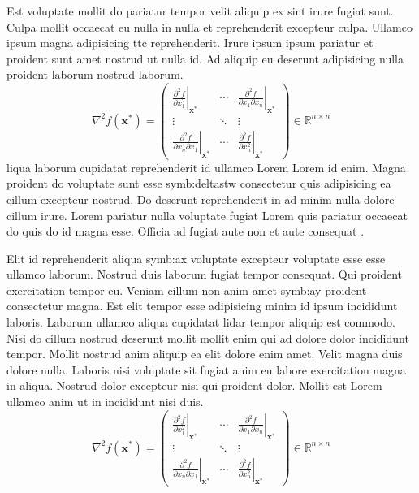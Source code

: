 Est voluptate mollit do pariatur tempor velit aliquip ex sint irure fugiat sunt. 
Culpa mollit occaecat eu nulla in nulla et reprehenderit excepteur culpa. 
Ullamco ipsum magna adipisicing \gls{ttc} reprehenderit.
Irure ipsum ipsum pariatur et proident sunt amet nostrud ut nulla id. 
Ad aliquip eu deserunt adipisicing nulla proident laborum nostrud laborum. 
\begin{equation}
    \nabla^2 f(\bm{x}^*) = 
    \begin{pmatrix}
        \left.\frac{\partial^2 f}{\partial x_1^2}\right\rvert_{\bm{x}^*} & \cdots &  \left.\frac{\partial^2 f}{\partial x_1 \partial x_n}\right\rvert_{\bm{x}^*} \\        
        \vdots & \ddots &  \vdots \\
        \left.\frac{\partial^2 f}{\partial x_n \partial x_1}\right\rvert_{\bm{x}^*} & \cdots &  \left.\frac{\partial^2 f}{\partial x_n^2}\right\rvert_{\bm{x}^*} 
    \end{pmatrix}
    \in  \mathbb{R}^{n \times n}
\end{equation}
liqua laborum cupidatat reprehenderit id ullamco Lorem Lorem id enim. 
Magna proident do voluptate sunt esse \gls{symb:deltastw} consectetur quis adipisicing ea cillum excepteur nostrud. 
Do deserunt reprehenderit in ad minim nulla dolore cillum irure. 
Lorem pariatur nulla voluptate fugiat Lorem quis pariatur occaecat do quis do id magna esse. 
Officia ad fugiat aute non et aute consequat \cite{Arens.2015}.

Elit id reprehenderit aliqua \gls{symb:ax} voluptate excepteur voluptate esse esse ullamco laborum. 
Nostrud duis laborum fugiat tempor consequat. Qui proident exercitation tempor eu. 
Veniam cillum non anim amet \gls{symb:ay} proident consectetur magna. 
Est elit tempor esse adipisicing minim id ipsum incididunt laboris.
Laborum ullamco aliqua cupidatat \gls{lidar} tempor aliquip est commodo. 
Nisi do cillum nostrud deserunt mollit mollit enim qui ad dolore dolor incididunt tempor. 
Mollit nostrud anim aliquip ea elit dolore enim amet. Velit magna duis dolore nulla. 
Laboris nisi voluptate sit fugiat anim eu labore exercitation magna in aliqua. 
Nostrud dolor excepteur nisi qui proident dolor. Mollit est Lorem ullamco anim ut in incididunt nisi duis.
\begin{equation}
    \nabla^2 f(\bm{x}^*) = 
    \begin{pmatrix}
        \left.\frac{\partial^2 f}{\partial x_1^2}\right\rvert_{\bm{x}^*} & \cdots &  \left.\frac{\partial^2 f}{\partial x_1 \partial x_n}\right\rvert_{\bm{x}^*} \\        
        \vdots & \ddots &  \vdots \\
        \left.\frac{\partial^2 f}{\partial x_n \partial x_1}\right\rvert_{\bm{x}^*} & \cdots &  \left.\frac{\partial^2 f}{\partial x_n^2}\right\rvert_{\bm{x}^*} 
    \end{pmatrix}
    \in  \mathbb{R}^{n \times n}
\end{equation}

